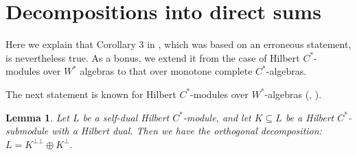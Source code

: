 \documentclass[12pt]{amsart}
\newtheorem{lem}[teo]{Lemma}
\newtheorem{cor}[teo]{Corollary}
\begin{document}


\section{Decompositions into direct sums}
 
Here we explain that Corollary 3 in \cite{FrTroFA}, which was based on an erroneous statement, is nevertheless true.
As a bonus, we extend it from the case of Hilbert $C^*$-modules over $W^*$ algebras to that over monotone 
complete $C^*$-algebras. 



The next statement is known for Hilbert $C^*$-modules over $W^*$-algebras (\cite{FrTroFA}, \cite[Lemma 3.6.1]{MTBook}).

\begin{lem}\label{lem:botbot_ker}
Let $L$ be a self-dual Hilbert $C^*$-module, and let $K\subseteq L$ be a Hilbert $C^*$-submodule with a Hilbert dual. Then we have the orthogonal decomposition:
$
L=K^{\bot\bot}\oplus K^\bot.
$
\end{lem}
\end{document}
